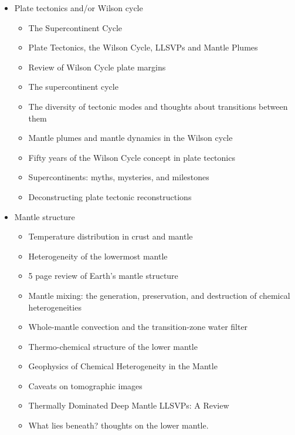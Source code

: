 \begin{itemize}
\item Plate tectonics and/or Wilson cycle
   \begin{itemize}
   \item [\nineteeneightyeight] The Supercontinent Cycle \cite{nawm88}
   \item [\twothousandeleven] Plate Tectonics, the Wilson Cycle, LLSVPs and Mantle Plumes \cite{burk11}
   \item [\twothousandfourteen] Review of Wilson Cycle plate margins \cite{buto14}
   \item [\twothousandfourteen] The supercontinent cycle \cite{nams14}
   \item [\twothousandeighteen] The diversity of tectonic modes and thoughts about transitions between them \cite{lena18}
   \item [\twothousandnineteen] Mantle plumes and mantle dynamics in the Wilson cycle \cite{hero19}
   \item [\twothousandnineteen] Fifty years of the Wilson Cycle concept in plate tectonics \cite{wihb19}
   \item [\twothousandnineteen] Supercontinents: myths, mysteries, and milestones \cite{panm19} 
   \item [\twothousandtwentythree] Deconstructing plate tectonic reconstructions \cite{sewd23}
   \end{itemize}

\item Mantle structure
   \begin{itemize}
   \item [\nineteeneightysix] Temperature distribution in crust and mantle \cite{jemo86}
   \item [\twothousand] Heterogeneity of the lowermost mantle \cite{garn00}
   \item [\twothousandone] 5 page review of Earth's mantle structure \cite{hewo01}
   \item [\twothousandtwo] Mantle mixing: the generation, preservation, and destruction of chemical heterogeneities \cite{vahb02}
   \item [\twothousandthree] Whole-mantle convection and the transition-zone water filter \cite{beka03}
   \item [\twothousandseven] Thermo-chemical structure of the lower mantle \cite{dett07}
   \item [\twothousandtwelve] Geophysics of Chemical Heterogeneity in the Mantle \cite{stli12}
   \item [\twothousandthirteen] Caveats on tomographic images \cite{fopa13}
   \item [\twothousandfifteen] Thermally Dominated Deep Mantle LLSVPs: A Review \cite{dagl15}
   \item [\twothousandnineteen] What lies beneath? thoughts on the lower mantle. \cite{hega19}
   \end{itemize}


\end{itemize}
